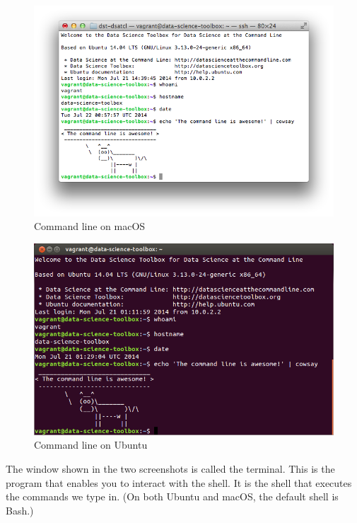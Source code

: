 \documentclass[
]{book}
\theoremstyle{definition}
\theoremstyle{definition}
\theoremstyle{definition}
\theoremstyle{remark}
\begin{document}
\begin{figure}

{\centering \includegraphics[width=9.5in]{images/screenshot_terminal_mac_dst} 

}

\caption{Command line on macOS}\label{fig:mac-terminal}
\end{figure}

\begin{figure}

{\centering \includegraphics[width=10.06in]{images/screenshot_terminal_ubuntu_dst} 

}

\caption{Command line on Ubuntu}\label{fig:ubuntu-terminal}
\end{figure}

The window shown in the two screenshots is called the terminal. This is the program that enables you to interact with the shell. It is the shell that executes the commands we type in. (On both Ubuntu and macOS, the default shell is Bash.)
\end{document}
